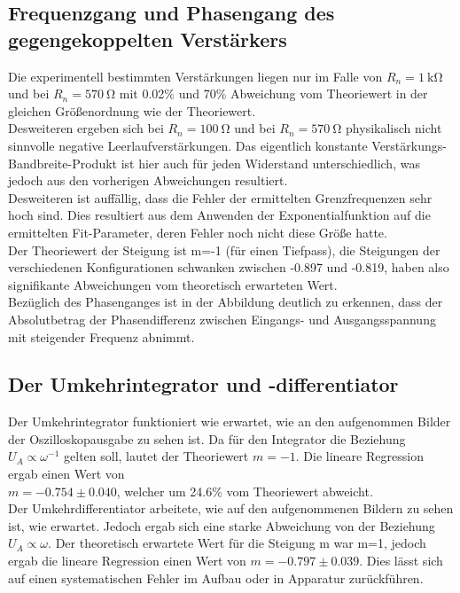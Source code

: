 \documentclass[]{scrartcl}
\begin{document}
\subsection{Frequenzgang und Phasengang des gegengekoppelten Verstärkers}
Die experimentell bestimmten Verstärkungen liegen nur im Falle von $R_n=\SI{1}{\kilo\ohm}$ und bei $R_n=\SI{570}{\ohm}$ mit 0.02\% und 70\% Abweichung vom Theoriewert in der gleichen Größenordnung wie der Theoriewert. \\
Desweiteren ergeben sich bei $R_n=\SI{100}{\ohm}$ und bei $R_n=\SI{570}{\ohm}$ physikalisch nicht sinnvolle negative Leerlaufverstärkungen. Das eigentlich konstante Verstärkungs-Bandbreite-Produkt ist hier auch für jeden Widerstand unterschiedlich, was jedoch aus den vorherigen Abweichungen resultiert. \\
Desweiteren ist auffällig, dass die Fehler der ermittelten Grenzfrequenzen sehr hoch sind. Dies resultiert aus dem Anwenden der Exponentialfunktion auf die ermittelten Fit-Parameter, deren Fehler noch nicht diese Größe hatte. \\
Der Theoriewert der Steigung ist m=-1 (für einen Tiefpass), die Steigungen der verschiedenen Konfigurationen schwanken zwischen -0.897 und -0.819, haben also signifikante Abweichungen vom theoretisch erwarteten Wert. \\
Bezüglich des Phasenganges ist in der Abbildung deutlich zu erkennen, dass der Absolutbetrag der Phasendifferenz zwischen Eingangs- und Ausgangsspannung mit steigender Frequenz abnimmt. 

\subsection{Der Umkehrintegrator und -differentiator}
Der Umkehrintegrator funktioniert wie erwartet, wie an den aufgenommen Bilder der Oszilloskopausgabe zu sehen ist. Da für den Integrator die Beziehung $U_A\propto\omega^{-1}$ gelten soll, lautet der Theoriewert $m=-1$. Die lineare Regression ergab einen Wert von  \\$m=-0.754\pm0.040$, welcher um 24.6\% vom Theoriewert abweicht. \\
Der Umkehrdifferentiator arbeitete, wie auf den aufgenommenen Bildern zu sehen ist, wie erwartet. Jedoch ergab sich eine starke Abweichung von der Beziehung $U_A\propto\omega$. Der theoretisch erwartete Wert für die Steigung m war m=1, jedoch ergab die lineare Regression einen Wert von $m = -0.797 \pm 0.039$. Dies lässt sich auf einen systematischen Fehler im Aufbau oder in Apparatur zurückführen.
\end{document}
